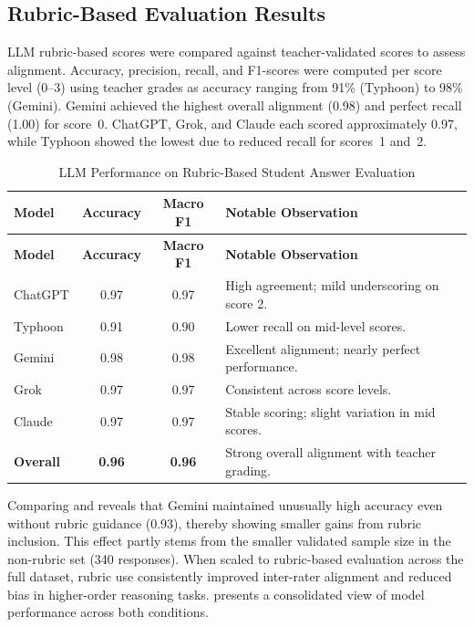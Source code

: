 \subsection{Rubric-Based Evaluation Results}

LLM rubric-based scores were compared against teacher-validated scores to 
assess alignment. Accuracy, precision, recall, and F1-scores 
were computed per score level (0–3) using teacher grades as 
accuracy ranging from 91\% (Typhoon) to 98\% (Gemini). Gemini 
achieved the highest overall alignment (0.98) and perfect 
recall (1.00) for score~0. ChatGPT, Grok, and Claude each 
scored approximately 0.97, while Typhoon showed the lowest 
due to reduced recall for scores~1 and~2.

{
\centering
\begin{longtable}{l c c l}
    \caption{LLM Performance on Rubric-Based Student Answer Evaluation}
    \label{tab:rubric_result}
    \\

    \hline
    \textbf{Model} & \textbf{Accuracy} & \textbf{Macro F1} & \textbf{Notable Observation} \\
    \hline
    \endfirsthead

    \hline
    \textbf{Model} & \textbf{Accuracy} & \textbf{Macro F1} & \textbf{Notable Observation} \\
    \hline
    \endhead

    \hline
    \endfoot

    ChatGPT & 0.97 & 0.97 & High agreement; mild underscoring on score 2. \\
    Typhoon & 0.91 & 0.90 & Lower recall on mid-level scores. \\
    Gemini & 0.98 & 0.98 & Excellent alignment; nearly perfect performance. \\
    Grok & 0.97 & 0.97 & Consistent across score levels. \\
    Claude & 0.97 & 0.97 & Stable scoring; slight variation in mid scores. \\
    \hline
    \textbf{Overall} & \textbf{0.96} & \textbf{0.96} & Strong overall alignment with teacher grading. \\
    
\end{longtable}
}

Comparing  and  
reveals that Gemini maintained unusually high accuracy even 
without rubric guidance (0.93), thereby showing smaller gains 
from rubric inclusion. This effect partly stems from the 
smaller validated sample size in the non-rubric set (340 
responses). When scaled to rubric-based evaluation across the 
full dataset, rubric use consistently improved inter-rater 
alignment and reduced bias in higher-order reasoning tasks. 
 presents a 
consolidated view of model performance across both conditions.

